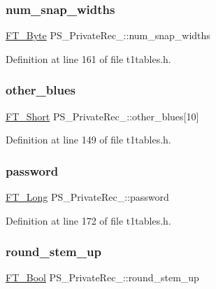 \subsubsection{\texorpdfstring{num\_snap\_widths}{num\_snap\_widths}}
{\footnotesize\ttfamily \mbox{\hyperlink{fttypes_8h_a51f26183ca0c9f4af958939648caeccd}{F\+T\+\_\+\+Byte}} P\+S\+\_\+\+Private\+Rec\+\_\+\+::num\+\_\+snap\+\_\+widths}



Definition at line 161 of file t1tables.\+h.

\mbox{\label{struct_p_s___private_rec___a6da97f89e174d621936c75fe9b463e65}} 
\subsubsection{\texorpdfstring{other\_blues}{other\_blues}}
{\footnotesize\ttfamily \mbox{\hyperlink{fttypes_8h_aa7279be89046a2563cd3d4d6651fbdcf}{F\+T\+\_\+\+Short}} P\+S\+\_\+\+Private\+Rec\+\_\+\+::other\+\_\+blues\mbox{[}10\mbox{]}}



Definition at line 149 of file t1tables.\+h.

\mbox{\label{struct_p_s___private_rec___a309a871cdeb6f658d8fbff23fa13b667}} 
\subsubsection{\texorpdfstring{password}{password}}
{\footnotesize\ttfamily \mbox{\hyperlink{fttypes_8h_a7fa72a1f0e79fb1860c5965789024d6f}{F\+T\+\_\+\+Long}} P\+S\+\_\+\+Private\+Rec\+\_\+\+::password}



Definition at line 172 of file t1tables.\+h.

\mbox{\label{struct_p_s___private_rec___a96b9729811d02146a87ffdc5c254bbe9}} 
\subsubsection{\texorpdfstring{round\_stem\_up}{round\_stem\_up}}
{\footnotesize\ttfamily \mbox{\hyperlink{fttypes_8h_a1a832a256bb5a7e6e884afaa1a07f3ae}{F\+T\+\_\+\+Bool}} P\+S\+\_\+\+Private\+Rec\+\_\+\+::round\+\_\+stem\+\_\+up}



